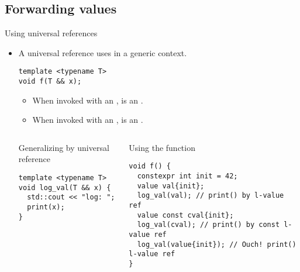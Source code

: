 \subsection{Forwarding values}

\begin{frame}[t,fragile]{Using universal references}
\begin{itemize}
  \item A universal reference uses \cppkey{\&\&} in a generic context.
\begin{lstlisting}
template <typename T>
void f(T && x);
\end{lstlisting}
    
     \pause
     \begin{itemize}
       \item When invoked with an ,  is an .
       \item When invoked with an ,  is an .
     \end{itemize}

\pause
\begin{columns}[T]

\begin{block}{Generalizing by universal reference}
\begin{lstlisting}
template <typename T>
void log_val(T && x) {
  std::cout << "log: ";
  print(x);
}
\end{lstlisting}
\end{block}

\begin{block}{Using the function}
\begin{lstlisting}
void f() {
  constexpr int init = 42;
  value val{init};
  log_val(val); // print() by l-value ref
  value const cval{init};
  log_val(cval); // print() by const l-value ref
  log_val(value{init}); // Ouch! print() l-value ref
}
\end{lstlisting}
\end{block}

\end{columns}

\end{itemize}
\end{frame}

